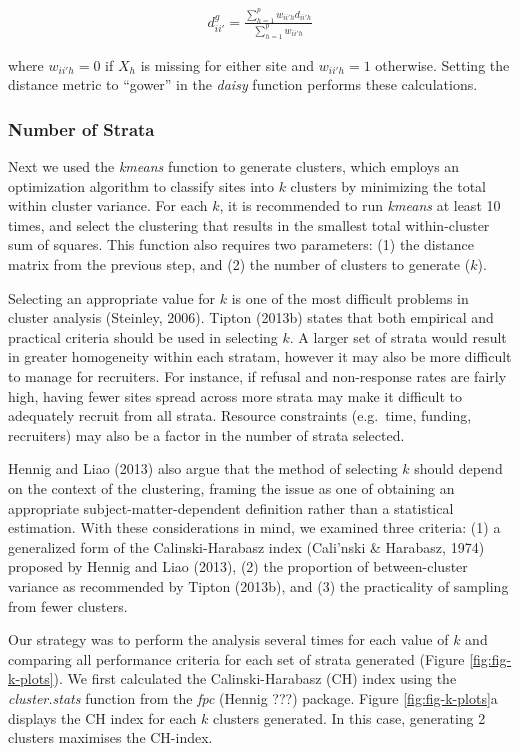 \documentclass[man,floatsintext]{apa6}
\begin{document}
\begin{align}
  d^{g}_{ii'} = \frac{\sum^p_{h = 1}w_{ii'h}d_{ii'h}}{\sum^p_{h = 1}w_{ii'h}}
\end{align}

where \(w_{ii'h} = 0\) if \(X_h\) is missing for either site and \(w_{ii'h} = 1\) otherwise. Setting the distance metric to \enquote{gower} in the \emph{daisy} function performs these calculations.

\hypertarget{number-of-strata}{%
\subsubsection{Number of Strata}\label{number-of-strata}}

Next we used the \emph{kmeans} function to generate clusters, which employs an optimization algorithm to classify sites into \(k\) clusters by minimizing the total within cluster variance. For each \(k\), it is recommended to run \emph{kmeans} at least 10 times, and select the clustering that results in the smallest total within-cluster sum of squares. This function also requires two parameters: (1) the distance matrix from the previous step, and (2) the number of clusters to generate (\(k\)).

Selecting an appropriate value for \(k\) is one of the most difficult problems in cluster analysis (Steinley, 2006). Tipton (2013b) states that both empirical and practical criteria should be used in selecting \(k\). A larger set of strata would result in greater homogeneity within each stratam, however it may also be more difficult to manage for recruiters. For instance, if refusal and non-response rates are fairly high, having fewer sites spread across more strata may make it difficult to adequately recruit from all strata. Resource constraints (e.g.~time, funding, recruiters) may also be a factor in the number of strata selected.

Hennig and Liao (2013) also argue that the method of selecting \(k\) should depend on the context of the clustering, framing the issue as one of obtaining an appropriate subject-matter-dependent definition rather than a statistical estimation. With these considerations in mind, we examined three criteria: (1) a generalized form of the Calinski-Harabasz index (Cali\a'nski \& Harabasz, 1974) proposed by Hennig and Liao (2013), (2) the proportion of between-cluster variance as recommended by Tipton (2013b), and (3) the practicality of sampling from fewer clusters.

Our strategy was to perform the analysis several times for each value of \(k\) and comparing all performance criteria for each set of strata generated (Figure \ref{fig:fig-k-plots}). We first calculated the Calinski-Harabasz (CH) index using the \emph{cluster.stats} function from the \emph{fpc} (Hennig ???) package. Figure \ref{fig:fig-k-plots}a displays the CH index for each \(k\) clusters generated. In this case, generating 2 clusters maximises the CH-index.
\end{document}
